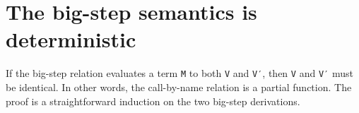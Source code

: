 \hypertarget{the-big-step-semantics-is-deterministic}{%
\section{The big-step semantics is
deterministic}\label{the-big-step-semantics-is-deterministic}}

If the big-step relation evaluates a term \texttt{M} to both \texttt{V}
and \texttt{V′}, then \texttt{V} and \texttt{V′} must be identical. In
other words, the call-by-name relation is a partial function. The proof
is a straightforward induction on the two big-step derivations.

\begin{fence}
\begin{code}%
\>[0]\AgdaSpace{}%
\AgdaSymbol{:}\AgdaSpace{}%
\AgdaSymbol{\}\{}\AgdaSpace{}%
\AgdaSymbol{:}\AgdaSpace{}%
\AgdaSpace{}%
\AgdaSymbol{\}\{}\AgdaSpace{}%
\AgdaSymbol{:}\AgdaSpace{}%
\AgdaSpace{}%
\AgdaSpace{}%
\AgdaSymbol{\}\{}\AgdaSpace{}%
\AgdaSpace{}%
\AgdaSymbol{:}\AgdaSpace{}%
\AgdaSymbol{\}}\<%
\\
\>[0][@{}l@{\AgdaIndent{0}}]%
\>[2]\AgdaSpace{}%
\AgdaSpace{}%
\AgdaSpace{}%
\AgdaSpace{}%
\AgdaSpace{}%
\AgdaSpace{}%
\AgdaSpace{}%
\AgdaSpace{}%
\AgdaSpace{}%
\AgdaSpace{}%
\AgdaSpace{}%
\<%
\\
%
\>[2]\AgdaSpace{}%
\AgdaSpace{}%
\AgdaSpace{}%
\<%
\\
\>[0]\AgdaSpace{}%
\AgdaSymbol{(}\AgdaSpace{}%
\AgdaSpace{}%
\AgdaSymbol{)}\AgdaSpace{}%
\AgdaSymbol{(}\AgdaSpace{}%
\AgdaSpace{}%
\AgdaSymbol{)}\<%
\\
\>[0][@{}l@{\AgdaIndent{0}}]%
\>[4]\AgdaSpace{}%
\AgdaSpace{}%
\AgdaSymbol{(}\AgdaSpace{}%
\AgdaSymbol{)}\AgdaSpace{}%
\<%
\\
\>[0]\AgdaSpace{}%

\end{code}
\end{fence}
